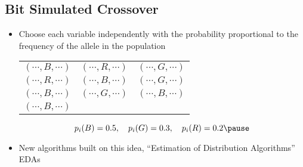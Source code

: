 \begin{slide}
\section{Bit Simulated Crossover}

\begin{PauseHighLight}
  \begin{itemize}
  \item Choose each variable independently with the probability
    proportional to the frequency of the allele in the population\pause
    \begin{center}
      \begin{tabular}{ccc}
      $(\cdots, B, \cdots)$ & $(\cdots, R, \cdots)$ & $(\cdots, G, \cdots)$ \\
      $(\cdots, R, \cdots)$ & $(\cdots, B, \cdots)$ & $(\cdots, G, \cdots)$ \\
      $(\cdots, B, \cdots)$ & $(\cdots, G, \cdots)$ & $(\cdots, B, \cdots)$ \\
      $(\cdots, B, \cdots)$
      \end{tabular}\pause
    \end{center}
    \begin{displaymath}
      p_i(B) = 0.5, \hspace{1em} p_i(G) = 0.3, \hspace{1em} p_i(R) = 0.2\pause
    \end{displaymath}
  \item New algorithms built on this idea, ``Estimation of Distribution
    Algorithms'' EDAs\pause
  \end{itemize}
\end{PauseHighLight}

\end{slide}



